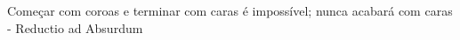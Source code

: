 \documentclass[preview]{standalone}
\begin{document}
\begin{center}
Começar com coroas e terminar com caras é impossível; 
 nunca acabará com caras - Reductio ad Absurdum
\end{center}
\end{document}
